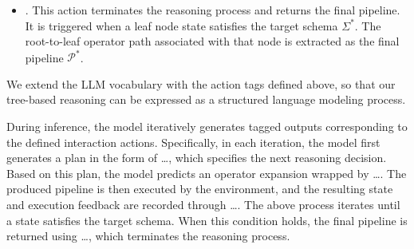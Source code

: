 \begin{itemize}[leftmargin=1em]
    \item {}.
    This action terminates the reasoning process and returns the final pipeline.
    It is triggered when a leaf node state satisfies the target schema $\Sigma^\ast$.
    The root-to-leaf operator path associated with that node is extracted as the final pipeline $\mathcal{P}^\ast$.
%

\end{itemize}

We extend the LLM vocabulary with the action tags defined above, so that our tree-based reasoning can be expressed as a structured language modeling process.

During inference, the model iteratively generates tagged outputs corresponding to the defined interaction actions. Specifically, in each iteration, the model first generates a plan in the form of \ldots{}, which specifies the next reasoning decision. Based on this plan, the model predicts an operator expansion wrapped by \ldots{}. The produced pipeline is then executed by the environment, and the resulting state and execution feedback are recorded through \ldots{}. The above process iterates until a state satisfies the target schema. When this condition holds, the final pipeline is returned using \ldots{}, which terminates the reasoning process.

